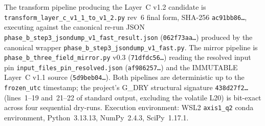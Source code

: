 \documentclass[11pt,a4paper]{ltjsarticle}
\begin{document}
The transform pipeline producing the Layer~C v1.2 candidate is
\texttt{transform\_layer\_c\_v1\_1\_to\_v1\_2.py} rev~6 final form,
SHA-256 \texttt{ac91bb86\dots}, executing against the canonical re-run
JSON \texttt{phase\_b\_step3\_jsondump\_v1\_fast\_result.json}
(\texttt{062f73aa\dots}) produced by the canonical wrapper
\texttt{phase\_b\_step3\_jsondump\_v1\_fast.py}. The mirror pipeline
is \texttt{phase\_b\_three\_field\_mirror.py} v0.3
(\texttt{71dfdc56\dots}) reading the resolved input pin
\texttt{input\_files\_pin\_resolved.json} (\texttt{af986257\dots})
and the IMMUTABLE Layer~C v1.1 source (\texttt{5d9beb04\dots}). Both
pipelines are deterministic up to the \texttt{frozen\_utc} timestamp;
the project's G\_DRY structural signature \texttt{438d27f2\dots}
(lines~1--19 and~21--22 of standard output, excluding the volatile
L20) is bit-exact across four sequential dry-runs. Execution
environment: WSL2 \texttt{axis1\_q2} conda environment,
Python~3.13.13, NumPy~2.4.3, SciPy~1.17.1.

\end{document}
